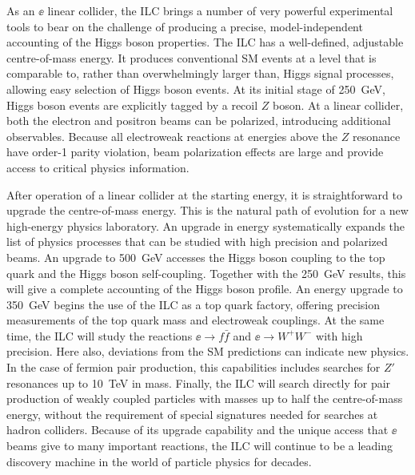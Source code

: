 As an $\ee$ linear  collider, the ILC brings a number of very powerful
experimental tools to bear on the challenge of producing a precise,
model-independent accounting of the Higgs boson properties.
The ILC has a well-defined, adjustable centre-of-mass energy.   It
produces conventional SM events at a level that is comparable to,
rather than overwhelmingly larger than, Higgs signal processes,
allowing easy selection of Higgs boson events.   At its initial stage
of 250~GeV, Higgs boson events are explicitly tagged by a recoil $Z$
boson.    At a linear collider, both the electron and positron beams
can be polarized, introducing additional observables.  Because all
electroweak  reactions at energies above the $Z$ resonance have
order-1  parity violation, beam polarization effects are large  and
provide access to critical physics information. 

After operation of a linear collider at the starting energy, it is
straightforward to upgrade the centre-of-mass energy.  This is the
natural path of evolution  for a new high-energy physics laboratory.
An upgrade in energy
systematically expands the list of physics processes that can be
studied with high precision and polarized beams.   An upgrade to
500~GeV
accesses the Higgs boson coupling to the top quark and the Higgs boson
self-coupling.  Together with the 250~GeV results, this  will give
 a complete accounting of the Higgs boson
profile.
An energy upgrade to 350~GeV begins the use of the ILC as a top quark
factory,
offering precision measurements of the top quark mass and electroweak
couplings.  At the same time, the ILC will study the reactions $\ee\to
f\bar f$ and $\ee\to W^+W^-$ with high precision.   Here also,
deviations from the SM predictions can indicate new physics.  In the
case of fermion pair production, this capabilities includes searches
for $Z'$ resonances up to 10~TeV in mass.   Finally, the ILC will
search directly for pair production of  weakly coupled particles  with
masses up to half
the centre-of-mass energy, without the requirement of special
signatures needed for searches at hadron colliders. 
Because of its upgrade capability and the unique access that $\ee$ beams give
to many important reactions, the ILC will 
continue to be a leading discovery machine in the 
world of particle physics for decades.



